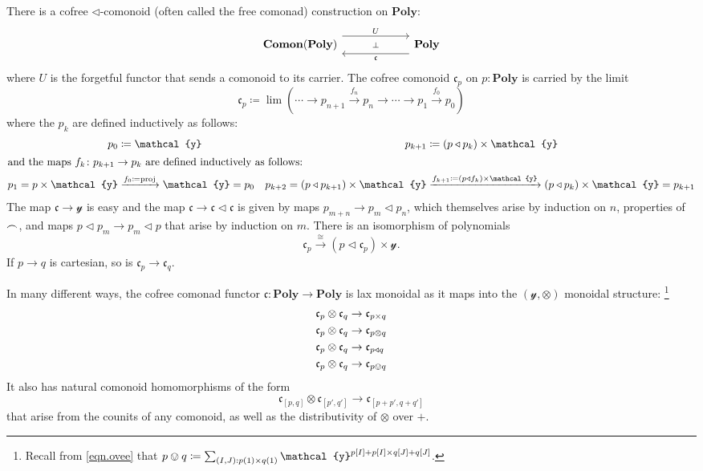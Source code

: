 \documentclass[11pt, one side, article]{memoir}
\theoremstyle{definition}
\theoremstyle{plain}
\newcommand{\Cat}[1]{\mathbf{#1}}%
\newcommand{\To}[2][]{\xrightarrow[#1]{#2}}
\newcommand{\tn}[1]{\textnormal{#1}}
\newcommand{\nn}{\mathbb{N}}
\newcommand{\smset}{\Cat{Set}}
\newcommand{\yon}{\mathcal{y}}
\newcommand{\poly}{\Cat{Poly}}
\newcommand{\0}{\textsf{0}}
\newcommand{\1}{\tn{\textsf{1}}}
\newcommand{\tri}{\mathbin{\triangleleft}}
\newcommand{\cofree}{\mathfrak{c}}
\newcommand{\indexcoclscale}[1]{\scalebox{.7}{#1}}
\newcommand{\cocl}[1]{
	\scriptsize\overset{\,\indexcoclscale{$#1$}}{\frown}\normalsize
}
\begin{document}
There is a cofree $\tri$-comonoid (often called the free comonad) construction on $\poly$:
\begin{equation}
\begin{tikzcd}[column sep=60pt]
	\Cat{Comon}(\poly)
  	\ar[from=r, shift left=8pt, "\cofree"]
		\ar[from=r, phantom, "\scriptstyle\bot"]
  	&
	\poly
		\ar[from=l, shift right=-8pt, "U"]
\end{tikzcd}
\end{equation}
where $U$ is the forgetful functor that sends a comonoid to its carrier. The cofree comonoid $\cofree_p$ on $p:\poly$ is carried by the limit
\begin{equation}
\cofree_p\coloneqq\lim(\cdots\to p_{n+1}\To{f_n} p_n\to\cdots\to p_1\To{f_0} p_0)
\end{equation}
where the $p_k$ are defined inductively as follows:
\begin{align}
	p_0&\coloneqq\yon&p_{k+1}&\coloneqq (p\tri p_k)\times\yon\\
\intertext{and the maps $f_k\colon p_{k+1}\to p_k$ are defined inductively as follows:}
	p_1=p\times\yon&\To{f_0\coloneqq\tn{proj}}\yon=p_0&p_{k+2}=(p\tri p_{k+1})\times\yon&\To{f_{k+1}\coloneqq(p\tri f_k)\times\yon}(p\tri p_{k})\times\yon=p_{k+1}
\end{align}
The map $\cofree\to\yon$ is easy and the map $\cofree\to\cofree\tri\cofree$ is given by maps $p_{m+n}\to p_m\tri p_n$, which themselves arise by induction on $n$, properties of $\cocl{}$, and maps $p\tri p_m\to p_m\tri p$ that  arise by induction on $m$. There is an isomorphism of polynomials
\begin{equation}\label{eqn.cofree_iso}
	\cofree_p\To{\cong} (p\tri\cofree_p)\times\yon.
\end{equation}
If $p\to q$ is cartesian, so is $\cofree_p\to\cofree_q$.

In many different ways, the cofree comonad functor $\cofree\colon\poly\to\poly$ is lax monoidal as it maps into the $(\yon,\otimes)$ monoidal structure:%
\footnote{Recall from \eqref{eqn.ovee} that $p\ovee q\coloneqq \sum_{(I,J): p(1)\times q(1)}\yon^{p[I]+p[I]\times q[J]+q[J]}$.}
\begin{align}
  \cofree_p\otimes\cofree_q&\to\cofree_{p\times q}\\
  \label{cofree_lax_monoidal}
  \cofree_p\otimes\cofree_q&\to\cofree_{p\otimes q}\\
  \cofree_p\otimes\cofree_q&\to\cofree_{p\tri q}\\
	\cofree_p\otimes\cofree_q&\to\cofree_{p\ovee q}  
\end{align}
It also has natural comonoid homomorphisms of the form
\begin{equation}
	\cofree_{[p,q]}\otimes\cofree_{[p',q']}\to\cofree_{[p+p',q+q']}
\end{equation}
that arise from the counits of any comonoid, as well as the distributivity of $\otimes$ over $+$.
\end{document}
